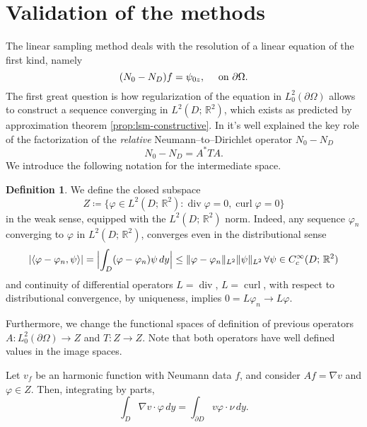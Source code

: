 \documentclass[10pt, a4paper, twoside, openright]{book}
\theoremstyle{definition}
\newtheorem{definition}[subsection]{Definition}
\theoremstyle{plain}
\theoremstyle{plain}
\theoremstyle{plain}
\theoremstyle{plain}
\theoremstyle{plain}
\theoremstyle{plain}
\theoremstyle{plain}
\theoremstyle{plain}
\DeclareMathOperator{\divergence}{div}
\DeclareMathOperator{\curl}{curl}
\let\phi\varphi
\begin{document}
\section{Validation of the methods}
\label{section:validation}
The linear sampling method deals with the resolution of a linear equation of the first kind, namely
\begin{equation}
\label{eq:NtoD_firstkind}
 ({N_0} - {N_D}) f = \psi_{0z},\quad \textup{ on }\partial \Omega.
\end{equation}
The first great question is how regularization of the equation in $L^2_0(\partial \Omega)$
allows to construct a sequence converging in $L^2(D;\,\mathbb{R}^2)$, which exists as predicted by approximation theorem \ref{prop:lsm-constructive}.
In \cite{arens:why} it's well explained the key role of the factorization 
of the \textit{relative} Neumann--to--Dirichlet operator ${N_0} - {N_D}$
\begin{equation}
 {N_0} - {N_D} = A^*TA.
\end{equation}
We introduce the following notation for the intermediate space.
\begin{definition}
We define the closed subspace
\begin{equation}
 Z\coloneqq\bigl\{\phi\in L^2(D;\,\mathbb{R}^2):\divergence\phi=0, \curl\phi=0\bigr\}
\end{equation}
in the weak sense, equipped with the $L^2(D;\,\mathbb{R}^2)$ norm. Indeed, any sequence $\phi_n$ converging to $\phi$ in $L^2(D;\,\mathbb{R}^2)$, converges even in the distributional sense
\begin{equation}
 |\langle\phi-\phi_n, \psi\rangle|=\Bigl|\int_D(\phi-\phi_n)\psi\,dy\Bigr|\leq\|\phi - \phi_n\|_{L^2}\|\psi\|_{L^2}\, \forall\psi\in C^\infty_c(D;\,\mathbb{R}^2)
\end{equation}
and continuity of differential operators $L=\divergence$, $L=\curl$, with respect to distributional convergence, by uniqueness, implies $0=L\phi_n\to L\phi$.
\par 
Furthermore, we change the functional spaces of definition of previous operators $A:L^2_0(\partial \Omega)\to Z$ and $T:Z \to Z$. 
Note that both operators have well defined values in the image spaces.
\end{definition}
Let $v_f$ be an harmonic function with Neumann data $f$, and consider $Af=\nabla v$ and $\phi\in Z$. Then, integrating by parts,
\begin{equation}
 \int_D\nabla v\cdot \phi\,dy=\int_{\partial D}v \phi\cdot\nu\,dy.
\end{equation}
\end{document}
